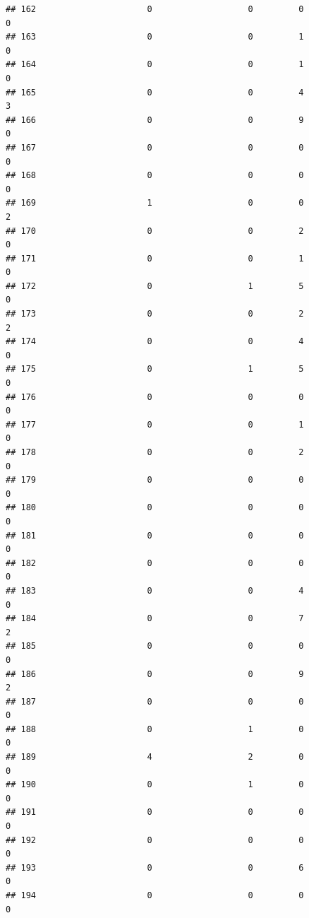 \documentclass[
]{article}
\begin{document}
\begin{verbatim}
## 162                      0                   0         0                  0
## 163                      0                   0         1                  0
## 164                      0                   0         1                  0
## 165                      0                   0         4                  3
## 166                      0                   0         9                  0
## 167                      0                   0         0                  0
## 168                      0                   0         0                  0
## 169                      1                   0         0                  2
## 170                      0                   0         2                  0
## 171                      0                   0         1                  0
## 172                      0                   1         5                  0
## 173                      0                   0         2                  2
## 174                      0                   0         4                  0
## 175                      0                   1         5                  0
## 176                      0                   0         0                  0
## 177                      0                   0         1                  0
## 178                      0                   0         2                  0
## 179                      0                   0         0                  0
## 180                      0                   0         0                  0
## 181                      0                   0         0                  0
## 182                      0                   0         0                  0
## 183                      0                   0         4                  0
## 184                      0                   0         7                  2
## 185                      0                   0         0                  0
## 186                      0                   0         9                  2
## 187                      0                   0         0                  0
## 188                      0                   1         0                  0
## 189                      4                   2         0                  0
## 190                      0                   1         0                  0
## 191                      0                   0         0                  0
## 192                      0                   0         0                  0
## 193                      0                   0         6                  0
## 194                      0                   0         0                  0

\end{verbatim}
\end{document}
